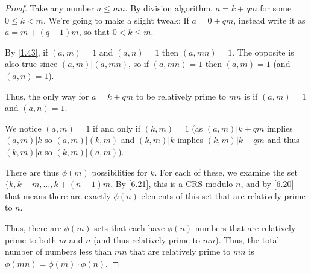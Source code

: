 \documentclass{article}
\numberwithin{equation}{thm}
\begin{document}
\begin{proof}
  Take any number $a \leq mn$. By division algorithm, $a = k + qm$ for some $0 \leq k < m$. We're going to make a slight tweak: If $a = 0 + qm$, instead write it as $a = m + (q-1)m$, so that $0 < k \leq m$.

  By \ref{1.43}, if $(a, m) = 1$ and $(a, n) = 1$ then $(a, mn) = 1$. The opposite is also true since $(a, m) | (a, mn)$, so if $(a, mn) = 1$ then $(a, m) = 1$ (and $(a, n) = 1$).

  Thus, the only way for $a = k + qm$ to be relatively prime to $mn$ is if $(a, m) = 1$ and $(a, n) = 1$.

  We notice $(a, m) = 1$ if and only if $(k, m) = 1$ (as $(a, m) | k + qm$ implies $(a, m) | k$ so $(a, m) | (k, m)$ and $(k, m) | k$ implies $(k, m) | k + qm$ and thus $(k, m) | a$ so $(k, m) | (a, m)$).

  There are thus $\phi(m)$ possibilities for $k$. For each of these, we examine the set $\{k, k + m, \ldots, k + (n-1)m$. By \ref{6.21}, this is a CRS modulo $n$, and by \ref{6.20} that means there are exactly $\phi(n)$ elements of this set that are relatively prime to $n$.

  Thus, there are $\phi(m)$ sets that each have $\phi(n)$ numbers that are relatively prime to both $m$ and $n$ (and thus relatively prime to $mn$). Thus, the total number of numbers less than $mn$ that are relatively prime to $mn$ is $\phi(mn) = \phi(m) \cdot \phi(n)$.
\end{proof}
\end{document}
